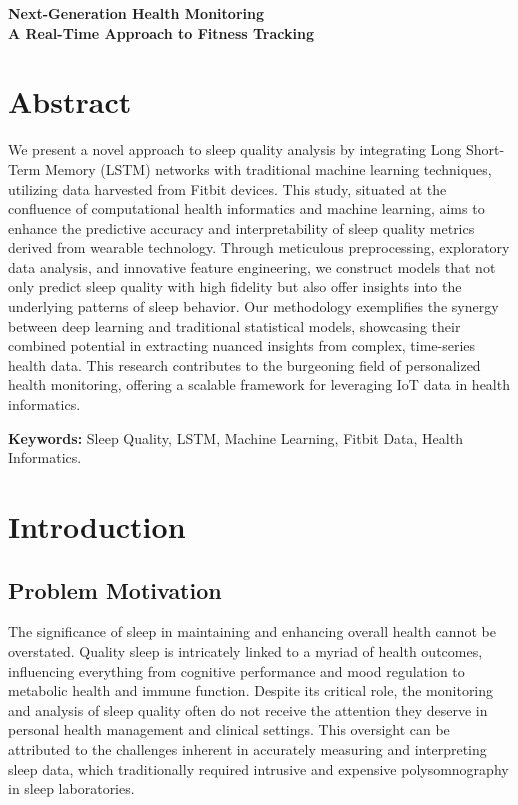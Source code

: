 \documentclass[10pt]{extarticle}
\begin{document}
\begin{center}
    {\LARGE \textbf{Next-Generation Health Monitoring}} \\
    {\large \textbf{A Real-Time Approach to Fitness Tracking}}
\end{center}

\section{Abstract}

We present a novel approach to sleep quality analysis by integrating Long Short-Term Memory (LSTM) networks with traditional machine learning techniques, utilizing data harvested from Fitbit devices. This study, situated at the confluence of computational health informatics and machine learning, aims to enhance the predictive accuracy and interpretability of sleep quality metrics derived from wearable technology. Through meticulous preprocessing, exploratory data analysis, and innovative feature engineering, we construct models that not only predict sleep quality with high fidelity but also offer insights into the underlying patterns of sleep behavior. Our methodology exemplifies the synergy between deep learning and traditional statistical models, showcasing their combined potential in extracting nuanced insights from complex, time-series health data. This research contributes to the burgeoning field of personalized health monitoring, offering a scalable framework for leveraging IoT data in health informatics.

\textbf{Keywords:} Sleep Quality, LSTM, Machine Learning, Fitbit Data, Health Informatics.

\section{Introduction}

\subsection{Problem Motivation}

The significance of sleep in maintaining and enhancing overall health cannot be overstated. Quality sleep is intricately linked to a myriad of health outcomes, influencing everything from cognitive performance and mood regulation to metabolic health and immune function. Despite its critical role, the monitoring and analysis of sleep quality often do not receive the attention they deserve in personal health management and clinical settings. This oversight can be attributed to the challenges inherent in accurately measuring and interpreting sleep data, which traditionally required intrusive and expensive polysomnography in sleep laboratories.
\end{document}
